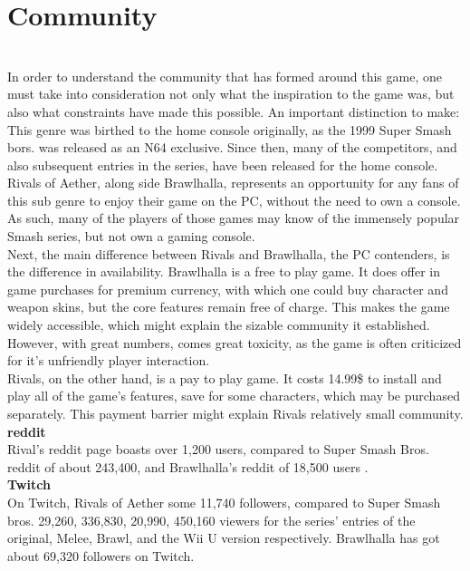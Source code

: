 \documentclass{article}
\begin{document}
\chapter{\textbf{Community}}\\

In order to understand the community that has formed around this game, one must take into consideration not only what the inspiration to the game was, but also what constraints have made this possible. An important distinction to make: This genre was birthed to the home console originally, as the 1999 Super Smash bors. was released as an N64 exclusive. Since then, many of the competitors, and also subsequent entries in the series, have been released for the home console.\\
Rivals of Aether, along side Brawlhalla, represents an opportunity for any fans of this sub genre to enjoy their game on the PC, without the need to own a console. As such, many of the players of those games may know of the immensely popular Smash series, but not own a gaming console.\\
Next, the main difference between Rivals and Brawlhalla, the PC contenders, is the difference in availability. Brawlhalla is a free to play game. It does offer in game purchases for premium currency, with which one could buy character and weapon skins, but the core features remain free of charge. This makes the game widely accessible, which might explain the sizable community it established. However, with great numbers, comes great toxicity, as the game is often criticized for it's unfriendly player interaction.\cite{steambrawlhalla:17}\\
Rivals, on the other hand, is a pay to play game. It costs 14.99\$ \cite{steam:6} to install and play all of the game's features, save for some characters, which may be purchased separately. This payment barrier might explain Rivals relatively small community.\\

\textbf{reddit}\\
Rival's reddit page boasts over 1,200 users, compared to Super Smash Bros. reddit of about 243,400, and Brawlhalla's reddit of 18,500 users \cite{reddit:4}.\\

\textbf{Twitch}\\
On Twitch, Rivals of Aether some 11,740 followers, compared to Super Smash bros. 29,260, 336,830, 20,990, 450,160 viewers for the series' entries of the original, Melee, Brawl, and the Wii U version respectively. Brawlhalla has got about 69,320 followers on Twitch. \cite{twitch:5}\\
\end{document}
